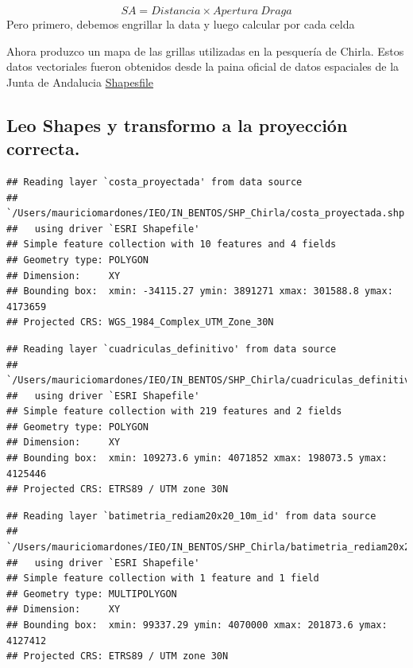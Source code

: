 \documentclass[
]{article}
\begin{document}
\[
SA = Distancia \times Apertura \ Draga
\]
Pero primero, debemos engrillar la data y luego calcular por cada celda

Ahora produzco un mapa de las grillas utilizadas en la pesquería de Chirla. Estos datos vectoriales fueron obtenidos desde la paina oficial de datos espaciales de la Junta de Andalucia \href{https://portalrediam.cica.es/descargas?path=\%2F08_AMBITOS_INTERES_AMBIENTAL\%2F02_LITORAL_MARINO\%2F04_SOCIOECONOMIA\%2FZonasProduccionMoluscos}{Shapesfile}

\hypertarget{leo-shapes-y-transformo-a-la-proyecciuxf3n-correcta.}{%
\subsection{Leo Shapes y transformo a la proyección correcta.}\label{leo-shapes-y-transformo-a-la-proyecciuxf3n-correcta.}}

\begin{verbatim}
## Reading layer `costa_proyectada' from data source 
##   `/Users/mauriciomardones/IEO/IN_BENTOS/SHP_Chirla/costa_proyectada.shp' 
##   using driver `ESRI Shapefile'
## Simple feature collection with 10 features and 4 fields
## Geometry type: POLYGON
## Dimension:     XY
## Bounding box:  xmin: -34115.27 ymin: 3891271 xmax: 301588.8 ymax: 4173659
## Projected CRS: WGS_1984_Complex_UTM_Zone_30N
\end{verbatim}

\begin{verbatim}
## Reading layer `cuadriculas_definitivo' from data source 
##   `/Users/mauriciomardones/IEO/IN_BENTOS/SHP_Chirla/cuadriculas_definitivo.shp' 
##   using driver `ESRI Shapefile'
## Simple feature collection with 219 features and 2 fields
## Geometry type: POLYGON
## Dimension:     XY
## Bounding box:  xmin: 109273.6 ymin: 4071852 xmax: 198073.5 ymax: 4125446
## Projected CRS: ETRS89 / UTM zone 30N
\end{verbatim}

\begin{verbatim}
## Reading layer `batimetria_rediam20x20_10m_id' from data source 
##   `/Users/mauriciomardones/IEO/IN_BENTOS/SHP_Chirla/batimetria_rediam20x20_10m_id.shp' 
##   using driver `ESRI Shapefile'
## Simple feature collection with 1 feature and 1 field
## Geometry type: MULTIPOLYGON
## Dimension:     XY
## Bounding box:  xmin: 99337.29 ymin: 4070000 xmax: 201873.6 ymax: 4127412
## Projected CRS: ETRS89 / UTM zone 30N
\end{verbatim}
\end{document}
